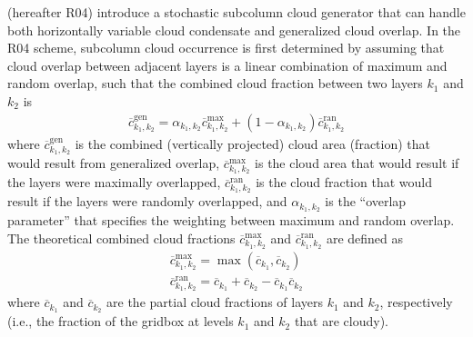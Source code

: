 \citet{raisanen_et_al_2004} (hereafter R04) introduce a stochastic
subcolumn cloud generator that can handle both horizontally variable
cloud condensate and generalized cloud overlap. In the R04 scheme,
subcolumn cloud occurrence is first determined by assuming that cloud
overlap between adjacent layers is a linear combination of maximum and
random overlap, such that the combined cloud fraction between two layers
\(k_1\) and \(k_2\) is \begin{equation}\begin{gathered}
    \overline{c}_{k_1, k_2}^\textrm{gen} 
        = \alpha_{k_1, k_2} \overline{c}_{k_1,k_2}^\textrm{max} 
        + (1 - \alpha_{k_1, k_2}) \overline{c}_{k_1, k_2}^\textrm{ran}
\end{gathered}\label{eq:generalized_overlap_equation}\end{equation}
where \(\overline{c}_{k_1, k_2}^\textrm{gen}\) is the combined
(vertically projected) cloud area (fraction) that would result from
generalized overlap, \(\overline{c}_{k_1,k_2}^\textrm{max}\) is the
cloud area that would result if the layers were maximally overlapped,
\(\overline{c}_{k_1, k_2}^\textrm{ran}\) is the cloud fraction that
would result if the layers were randomly overlapped, and
\(\alpha_{k_1, k_2}\) is the ``overlap parameter'' that specifies the
weighting between maximum and random overlap. The theoretical combined
cloud fractions \(\overline{c}^\textrm{max}_{k_1, k_2}\) and
\(\overline{c}^\textrm{ran}_{k_1, k_2}\) are defined as
\[\begin{gathered} 
    \overline{c}^\textrm{max}_{k_1, k_2} 
        = \max(\overline{c}_{k_1},\overline{ c}_{k_2}) \\         
            \overline{c}^\textrm{ran}_{k_1, k_2} 
        = \overline{c}_{k_1} + \overline{c}_{k_2} - \overline{c}_{k_1}         
            \overline{c}_{k_2}
\end{gathered}\] where \(\overline{c}_{k_1}\) and \(\overline{c}_{k_2}\)
are the partial cloud fractions of layers \(k_1\) and \(k_2\),
respectively (i.e., the fraction of the gridbox at levels \(k_1\) and
\(k_2\) that are cloudy).

